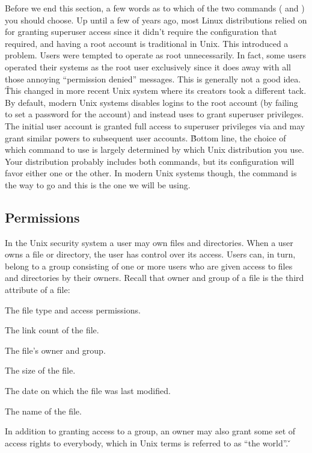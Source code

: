 Before we end this section, a few words as to which of the two commands ( and ) you should choose.
Up until a few of years ago, most Linux distributions relied on  for granting superuser access since it
didn't require the configuration that  required, and having a root account is traditional in Unix. This
introduced a problem. Users were tempted to operate as root unnecessarily. In fact, some users operated their systems
as the root user exclusively since it does away with all those annoying ``permission denied'' messages. This is
generally not a good idea. \v

This changed in more recent Unix system where its creators took a different tack. By default, modern Unix systems
disables logins to the root account (by failing to set a password for the account) and instead uses  to
grant superuser privileges. The initial user account is granted full access to superuser privileges via 
and may grant similar powers to subsequent user accounts. \v

Bottom line, the choice of which command to use is largely determined by which Unix distribution you use. Your
distribution probably includes both commands, but its configuration will favor either one or the other. In modern Unix
systems though, the  command is the way to go and this is the one we will be using.

\subsection{Permissions}

In the Unix security system a user may own files and directories. When a user owns a file or directory, the user has
control over its access. Users can, in turn, belong to a group consisting of one or more users who are given access
to files and directories by their owners. Recall that owner and group of a file is the third attribute of a file:
\bit
\item The file type and access permissions.
\item The link count of the file.
\item The file's owner and group.
\item The size of the file.
\item The date on which the file was last modified.
\item The name of the file.
\eit

In addition to granting access to a group, an owner may also grant some set of access rights to everybody, which in
Unix terms is referred to as ``the world''. \v

